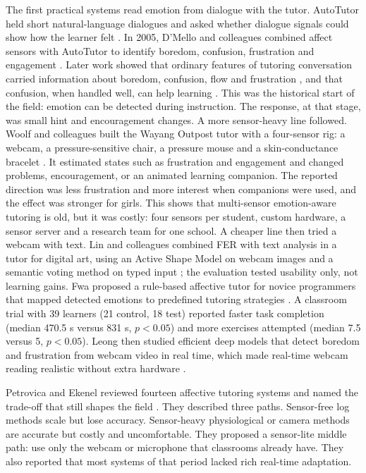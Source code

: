 The first practical systems read emotion from dialogue with the tutor. AutoTutor held short natural-language dialogues and asked whether dialogue signals could show how the learner felt \cite{Graesser2004AutoTutorDialogue}. In 2005, D'Mello and colleagues combined affect sensors with AutoTutor to identify boredom, confusion, frustration and engagement \cite{dmello_integrating_2005}. Later work showed that ordinary features of tutoring conversation carried information about boredom, confusion, flow and frustration \cite{DMello2008AutomaticDetectionLearnersAffect,dmello_language_2012}, and that confusion, when handled well, can help learning \cite{dmello2014confusionbeneficial}. This was the historical start of the field: emotion can be detected during instruction. The response, at that stage, was small hint and encouragement changes. A more sensor-heavy line followed. Woolf and colleagues built the Wayang Outpost tutor with a four-sensor rig: a webcam, a pressure-sensitive chair, a pressure mouse and a skin-conductance bracelet \cite{woolf_affect-aware_2009}. It estimated states such as frustration and engagement and changed problems, encouragement, or an animated learning companion. The reported direction was less frustration and more interest when companions were used, and the effect was stronger for girls. This shows that multi-sensor emotion-aware tutoring is old, but it was costly: four sensors per student, custom hardware, a sensor server and a research team for one school. A cheaper line then tried a webcam with text. Lin and colleagues combined \ac{FER} with text analysis in a tutor for digital art, using an Active Shape Model on webcam images and a semantic voting method on typed input \cite{lin_employing_2012}; the evaluation tested usability only, not learning gains. Fwa proposed a rule-based affective tutor for novice programmers that mapped detected emotions to predefined tutoring strategies \cite{fwa_architectural_2018}. A classroom trial with 39 learners (21 control, 18 test) reported faster task completion (median 470.5 s versus 831 s, $p<0.05$) and more exercises attempted (median 7.5 versus 5, $p<0.05$). Leong then studied efficient deep models that detect boredom and frustration from webcam video in real time, which made real-time webcam reading realistic without extra hardware \cite{leong_deep_2020}.

Petrovica and Ekenel reviewed fourteen affective tutoring systems and named the trade-off that still shapes the field \cite{petrovica_emotion_2016}. They described three paths. Sensor-free log methods scale but lose accuracy. Sensor-heavy physiological or camera methods are accurate but costly and uncomfortable. They proposed a sensor-lite middle path: use only the webcam or microphone that classrooms already have. They also reported that most systems of that period lacked rich real-time adaptation.

